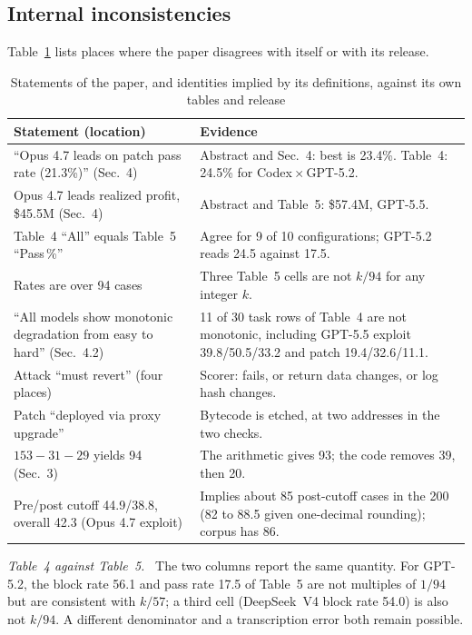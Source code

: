 \documentclass[conference]{IEEEtran}
\newcommand{\para}[1]{\textit{#1.}\ }
\begin{document}
\subsection{Internal inconsistencies}
Table~\ref{tab:incons} lists places where the paper disagrees with itself or with its release.

\begin{table}[t]
\caption{Statements of the paper, and identities implied by its definitions, against its own tables and release}
\label{tab:incons}
\centering
\footnotesize
\setlength{\tabcolsep}{3pt}
\begin{tabular}{@{}p{}p{}@{}}
\toprule
Statement (location) & Evidence \\
\midrule
``Opus 4.7 leads on patch pass rate (21.3\%)'' (Sec.~4) & Abstract and Sec.~4: best is 23.4\%. Table~4: 24.5\% for Codex\,$\times$\,GPT-5.2. \\
Opus 4.7 leads realized profit, \$45.5M (Sec.~4) & Abstract and Table~5: \$57.4M, GPT-5.5. \\
Table~4 ``All'' equals Table~5 ``Pass\,\%'' & Agree for 9 of 10 configurations; GPT-5.2 reads 24.5 against 17.5. \\
Rates are over 94 cases & Three Table~5 cells are not $k/94$ for any integer $k$. \\
``All models show monotonic degradation from easy to hard'' (Sec.~4.2) & 11 of 30 task rows of Table~4 are not monotonic, including GPT-5.5 exploit 39.8/50.5/33.2 and patch 19.4/32.6/11.1. \\
Attack ``must revert'' (four places) & Scorer: fails, or return data changes, or log hash changes. \\
Patch ``deployed via proxy upgrade'' & Bytecode is etched, at two addresses in the two checks. \\
$153-31-29$ yields 94 (Sec.~3) & The arithmetic gives 93; the code removes 39, then 20. \\
Pre/post cutoff 44.9/38.8, overall 42.3 (Opus 4.7 exploit) & Implies about 85 post-cutoff cases in the 200 (82 to 88.5 given one-decimal rounding); corpus has 86. \\
\bottomrule
\end{tabular}
\end{table}

\para{Table~4 against Table~5} The two columns report the same quantity. For GPT-5.2, the block rate 56.1 and pass rate 17.5 of Table~5 are not multiples of $1/94$ but are consistent with $k/57$; a third cell (DeepSeek~V4 block rate 54.0) is also not $k/94$. A different denominator and a transcription error both remain possible.
\end{document}
